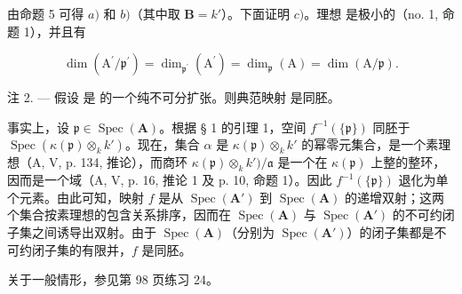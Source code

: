 由命题 5 可得 \(a)\) 和 \(b)\)（其中取 \(\mathbf{B} = k'\)）。下面证明 \(c)\)。理想  是极小的（no. 1, 命题 1），并且有

\[
\dim (\mathrm{A} ^ {\prime} / \mathfrak {p} ^ {\prime}) = \dim_ {\mathfrak {p} ^ {\prime}} (\mathrm{A} ^ {\prime}) = \dim_ {\mathfrak {p}} (\mathrm{A}) = \dim (\mathrm{A} / \mathfrak {p}).
\]

注 2. --- 假设  是  的一个纯不可分扩张。则典范映射  是同胚。

事实上，设 \(\mathfrak{p} \in \operatorname{Spec}(\mathbf{A})\)。根据 § 1 的引理 1，空间 \(f^{-1}(\{\mathfrak{p}\})\) 同胚于 \(\operatorname{Spec}(\kappa(\mathfrak{p}) \otimes_k k')\)。现在，集合 \(\alpha\) 是 \(\kappa(\mathfrak{p}) \otimes_k k'\) 的幂零元集合，是一个素理想（A, V, p. 134, 推论），而商环 \(\kappa(\mathfrak{p}) \otimes_k k')/\mathfrak{a}\) 是一个在 \(\kappa(\mathfrak{p})\) 上整的整环，因而是一个域（A, V, p. 16, 推论 1 及 p. 10, 命题 1）。因此 \(f^{-1}(\{\mathfrak{p}\})\) 退化为单个元素。由此可知，映射 \(f\) 是从 \(\operatorname{Spec}(\mathbf{A}')\) 到 \(\operatorname{Spec}(\mathbf{A})\) 的递增双射；这两个集合按素理想的包含关系排序，因而在 \(\operatorname{Spec}(\mathbf{A})\) 与 \(\operatorname{Spec}(\mathbf{A}')\) 的不可约闭子集之间诱导出双射。由于 \(\operatorname{Spec}(\mathbf{A})\)（分别为 \(\operatorname{Spec}(\mathbf{A}')\)）的闭子集都是不可约闭子集的有限并，\(f\) 是同胚。

关于一般情形，参见第 98 页练习 24。

